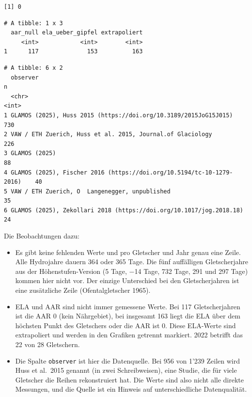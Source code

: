 \documentclass[
  nswissgerman,
  11pt,
  a4paper,
  DIV=11,
  numbers=noendperiod]{scrartcl}
\providecommand{\tightlist}{%
  \setlength{\itemsep}{0pt}\setlength{\parskip}{0pt}}
\begin{document}
\begin{verbatim}
[1] 0
\end{verbatim}

\begin{verbatim}
# A tibble: 1 x 3
  aar_null ela_ueber_gipfel extrapoliert
     <int>            <int>        <int>
1      117              153          163
\end{verbatim}

\begin{verbatim}
# A tibble: 6 x 2
  observer                                                                  n
  <chr>                                                                 <int>
1 GLAMOS (2025), Huss 2015 (https://doi.org/10.3189/2015JoG15J015)        730
2 VAW / ETH Zuerich, Huss et al. 2015, Journal.of Glaciology              226
3 GLAMOS (2025)                                                            88
4 GLAMOS (2025), Fischer 2016 (https://doi.org/10.5194/tc-10-1279-2016)    40
5 VAW / ETH Zuerich, O  Langenegger, unpublished                           35
6 GLAMOS (2025), Zekollari 2018 (https://doi.org/10.1017/jog.2018.18)      24
\end{verbatim}

Die Beobachtungen dazu:

\begin{itemize}
\tightlist
\item
  Es gibt keine fehlenden Werte und pro Gletscher und Jahr genau eine
  Zeile. Alle Hydrojahre dauern 364 oder 365 Tage. Die fünf auffälligen
  Gletscherjahre aus der Höhenstufen-Version (5 Tage, −14 Tage, 732
  Tage, 291 und 297 Tage) kommen hier nicht vor. Der einzige Unterschied
  bei den Gletscherjahren ist eine zusätzliche Zeile (Ofentalgletscher
  1965).
\item
  ELA und AAR sind nicht immer gemessene Werte. Bei 117 Gletscherjahren
  ist die AAR 0 (kein Nährgebiet), bei insgesamt 163 liegt die ELA über
  dem höchsten Punkt des Gletschers oder die AAR ist 0. Diese ELA-Werte
  sind extrapoliert und werden in den Grafiken getrennt markiert. 2022
  betrifft das 22 von 28 Gletschern.
\item
  Die Spalte \texttt{observer} ist hier die Datenquelle. Bei 956 von
  1'239 Zeilen wird Huss et al.~2015 genannt (in zwei Schreibweisen),
  eine Studie, die für viele Gletscher die Reihen rekonstruiert hat. Die
  Werte sind also nicht alle direkte Messungen, und die Quelle ist ein
  Hinweis auf unterschiedliche Datenqualität.
\end{itemize}
\end{document}
